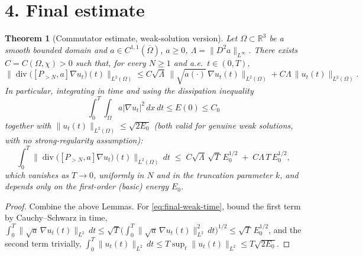 \documentclass[11pt,letterpaper]{amsart}
\newtheorem{theorem}{Theorem}[section]
\newcommand{\dive}{\operatorname{div}}
\newcommand{\Om}{\Omega}
\begin{document}
\section*{4. Final estimate}

\begin{theorem}[Commutator estimate, weak-solution version]\label{thm:final-weak}
Let $\Om\subset\mathbb R^3$ be a smooth bounded domain and $a\in C^{1,1}(\overline\Om)$, $a\ge0$, $\Lambda=\|D^2a\|_{L^\infty}$. There exists $C=C(\Om,\chi)>0$ such that, for every $N\ge1$ and a.e.\ $t\in(0,T)$,
\begin{equation}\label{eq:final-weak}
\big\|\dive\big([P_{>N},a]\nabla u_t\big)(t)\big\|_{L^2(\Om)} \le C\sqrt{\Lambda}\,\big\|\sqrt{a(\cdot)}\,\nabla u_t(t)\big\|_{L^2(\Om)} + C\Lambda\,\|u_t(t)\|_{L^2(\Om)}.
\end{equation}
In particular, integrating in time and using the dissipation inequality $$\int_0^T\!\int_\Om a|\nabla u_t|^2\,dx\,dt \le E(0)\le C_0$$ together with $\|u_t(t)\|_{L^2(\Om)}\le\sqrt{2E_0}$ (both valid for genuine \emph{weak} solutions, with no strong-regularity assumption):
\begin{equation}\label{eq:final-weak-time}
\int_0^T \big\|\dive\big([P_{>N},a]\nabla u_t\big)(t)\big\|_{L^2(\Om)}\,dt \;\le\; C\sqrt{\Lambda}\,\sqrt{T}\,E_0^{1/2} \;+\; C\Lambda\,T\,E_0^{1/2},
\end{equation}
which vanishes as $T\to0$, \emph{uniformly in $N$ and in the truncation parameter $k$}, and depends only on the first-order (basic) energy $E_0$.
\end{theorem}

\begin{proof}
Combine the above Lemmas. For \eqref{eq:final-weak-time}, bound the first term by Cauchy--Schwarz in time, $\int_0^T\|\sqrt a\,\nabla u_t(t)\|_{L^2}\,dt \le \sqrt T\big(\int_0^T\|\sqrt a\,\nabla u_t(t)\|^2_{L^2}\,dt\big)^{1/2} \le \sqrt T\,E_0^{1/2}$, and the second term trivially, $\int_0^T\|u_t(t)\|_{L^2}\,dt \le T\sup_t\|u_t(t)\|_{L^2}\le T\sqrt{2E_0}$.
\end{proof}
\end{document}
